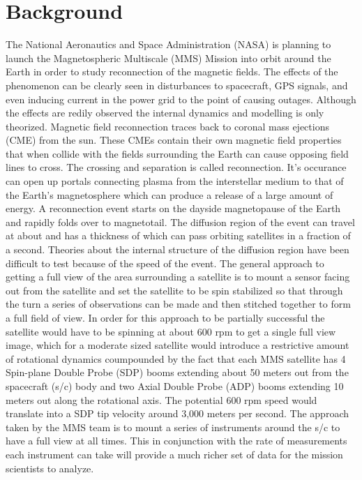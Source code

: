 
\chapter{Background}
\label{chap:Background}

The National Aeronautics and Space Administration (NASA) is planning to launch the Magnetospheric Multiscale (MMS) Mission into orbit around the Earth in order to study reconnection of the magnetic fields.  The effects of the phenomenon can be clearly seen in disturbances to spacecraft, GPS signals, and even inducing current in the power grid to the point of causing outages.  Although the effects are redily observed the internal dynamics and modelling is only theorized.  Magnetic field reconnection traces back to coronal mass ejections (CME) from the sun.  These CMEs contain their own magnetic field properties that when collide with the fields surrounding the Earth can cause opposing field lines to cross.  The crossing and separation is called reconnection.  It's occurance can open up portals connecting plasma from the interstellar medium to that of the Earth's magnetosphere which can produce a release of a large amount of energy.  A reconnection event starts on the dayside magnetopause of the Earth and
rapidly folds over to magnetotail.  The diffusion region of the event can travel at about  and has a thickness of  which can pass orbiting satellites in a fraction of a second.  Theories about the internal structure of the diffusion region  have been difficult to test because of the speed of the event.  The general approach to getting a full view of the area surrounding a satellite is to mount a sensor facing out from the satellite and set the satellite to be spin stabilized so that through the turn a series of observations can be made and then stitched together to form a full field of view.  In order for this approach to be partially successful the satellite would have to be spinning at about 600 rpm to get a single full view image, which for a moderate sized satellite would introduce a restrictive amount of rotational dynamics coumpounded by the fact that each MMS satellite has 4 Spin-plane Double Probe (SDP) booms  extending about 50 meters out from the spacecraft (s/c) body and two Axial Double Probe (ADP) booms extending 10 meters out along the rotational axis.  The potential 600 rpm speed would translate into a SDP tip velocity around 3,000 meters per second.
The approach taken by the MMS team is to mount a series of instruments around the s/c to have a full view at all times.  This in conjunction with the rate of measurements each instrument can take will provide a much richer set of data for the mission scientists to analyze.
